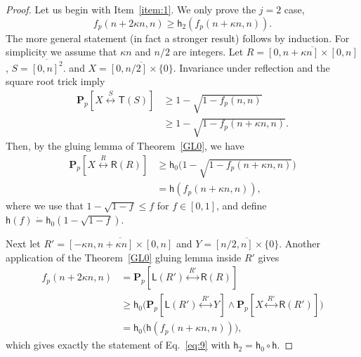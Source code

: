 \documentclass[12pt, twoside,a4paper,reqno]{amsart}
\theoremstyle{plain}
\theoremstyle{remark}
\theoremstyle{definition}
\newcommand{\PP}{\mathbf{P}}
\newcommand{\Pp}[1]{\PP_p \left [ #1 \right ]}
\newcommand{\lr}[1][]{\overset{\:#1\:}\longleftrightarrow}
\newcommand{\ol}{\overline}
\begin{document}
\begin{proof} %
  Let us begin with Item~\ref{item:1}. We only prove the $j=2$ case,
\begin{equation}
f_p(n+2\kappa n,n)\geq \mathsf{h}_{2}(f_p(n+\kappa n,n)).
\label{eq:9}
\end{equation}%
The more general statement (in fact a stronger result) follows by induction. For simplicity we assume that
$\kappa n$ and $n/2$ are integers. Let $R=\ol{[ 0,n+\kappa n]\times[0,n]}$, $S=\ol{[0,n]^2}$.
and $X=\ol{[0,n/2]\times \{0\}}$. Invariance under reflection and the square root
trick imply
\begin{align}
  \label{eq:37}
  \Pp{X\lr[S] \mathsf T(S)}&\ge 1-\sqrt{1-f_p(n,n)}\\
  &\ge 1-\sqrt{1-f_p(n+\kappa n,n)}.
\end{align}
Then, by the gluing lemma of Theorem~\ref{GL0}, we have
\begin{align}
  \label{eq:41}
  \Pp{X\lr[R] \mathsf R(R)}
   &\ge \mathsf h_0\big(1-\sqrt{1-f_p(n+\kappa n,n)}\big)\\
&= \mathsf h(f_p(n+\kappa n, n)),
\end{align}
where we use that $1-\sqrt{1-f} \leq f$ for $f \in [0,1]$, and define $\mathsf h(f)\dot =\mathsf{h}_0(1-\sqrt{1-f})$.

Next let $R'=\ol{[-\kappa n,n+\kappa n]\times[0,n]}$ and $Y=\ol{[n/2,n]\times \{0\}}$.
Another application of the Theorem~\ref{GL0} gluing lemma inside $R'$ gives
\begin{align}
  \label{eq:43}
  f_p(n+2\kappa n,n)&=\Pp{\mathsf L(R')\lr[R']\mathsf R(R)}\\
  &\ge\mathsf h_0 \big (\Pp{\mathsf L(R')\lr[R'] Y} \wedge  \Pp{
    X\lr[R']\mathsf R(R')}\big)\\
  &=\mathsf h_0 \big(\mathsf h (f_p(n+\kappa n, n))\big),
\end{align}
which gives exactly the statement of Eq.~\eqref{eq:9} with $\mathsf{h}_{2}= \mathsf{h}_{0} \circ \mathsf{h}$.




\end{proof}
\end{document}
